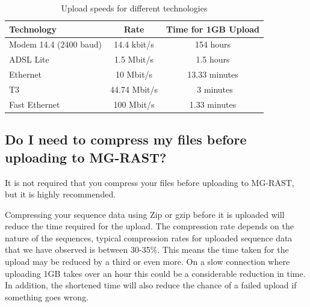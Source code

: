 \documentclass[12pt,fullpage]{report}
\begin{document}
\begin{table}
\caption{Upload speeds for different technologies}
\centering
\renewcommand{\arraystretch}{1.5}
\renewcommand\tabcolsep{20pt}
\begin{tabular}{ l c c }
  \hline
  \hline
  \textbf{Technology} & \textbf{Rate} & \textbf{Time for 1GB Upload} \\
  \hline
  Modem 14.4 (2400 baud) & 14.4 kbit/s & 154 hours \\
  ADSL Lite & 1.5 Mbit/s & 1.5 hours \\
  Ethernet & 10 Mbit/s & 13.33 minutes \\
  T3 & 44.74 Mbit/s & ~3 minutes \\
  Fast Ethernet & 100 Mbit/s & 1.33 minutes \\
  \hline
  \hline
\end{tabular}
\label{table:upload_speeds}
\end{table}

\subsection*{Do I need to compress my files before uploading to MG-RAST?}
It is not required that you compress your files before uploading to MG-RAST, but it is highly recommended.

Compressing your sequence data using Zip or gzip before it is uploaded will reduce the time required for the upload. The compression rate depends on the nature of the sequences, typical compression rates for uploaded sequence data that we have observed is between 30-35\%. This means the time taken for the upload may be reduced by a third or even more. On a slow connection where uploading 1GB takes over an hour this could be a considerable reduction in time. In addition, the shortened time will also reduce the chance of a failed upload if something goes wrong.
\end{document}
